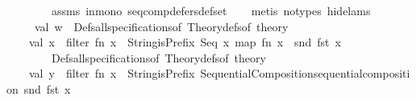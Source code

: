 \begin{isabellebody}
\ \ \ \ \ \ \ \ assms{\isacharparenleft}{\kern0pt}{}{\isacharparenright}{\kern0pt}\ in{\isacharunderscore}{\kern0pt}mono\ seq{\isacharunderscore}{\kern0pt}comp{\isacharunderscore}{\kern0pt}defers{\isacharunderscore}{\kern0pt}def{\isacharunderscore}{\kern0pt}set\isanewline
\ \ \isamarkupfalse%
\ {\isacharparenleft}{\kern0pt}metis\ {\isacharparenleft}{\kern0pt}no{\isacharunderscore}{\kern0pt}types{\isacharcomma}{\kern0pt}\ hide{\isacharunderscore}{\kern0pt}lams{\isacharparenright}{\kern0pt}{\isacharparenright}{\kern0pt}%
\endisatagproof
{\isafoldproof}%
%
\isadelimproof
\isanewline
%
\endisadelimproof
%
\isadelimML
\isanewline
%
\endisadelimML
%
\isatagML
{}\isamarkupfalse%
\ {\isacartoucheopen}\isanewline
\ \ \ \ {\isacharparenleft}{\kern0pt}{\isacharasterisk}{\kern0pt}\ val\ w\ {\isacharequal}{\kern0pt}\ {\isacharparenleft}{\kern0pt}Defs{\isachardot}{\kern0pt}all{\isacharunderscore}{\kern0pt}specifications{\isacharunderscore}{\kern0pt}of\ {\isacharparenleft}{\kern0pt}Theory{\isachardot}{\kern0pt}defs{\isacharunderscore}{\kern0pt}of\ {\isacharat}{\kern0pt}{\isacharbraceleft}{\kern0pt}theory{\isacharbraceright}{\kern0pt}{\isacharparenright}{\kern0pt}{\isacharparenright}{\kern0pt}\isanewline
\ \ \ \ val\ x\ {\isacharequal}{\kern0pt}\ filter\ {\isacharparenleft}{\kern0pt}fn\ x\ {\isacharequal}{\kern0pt}{\isachargreater}{\kern0pt}\ String{\isachardot}{\kern0pt}isPrefix\ {\isachardoublequote}{\kern0pt}Seq{\isachardoublequote}{\kern0pt}\ x{\isacharparenright}{\kern0pt}\ {\isacharparenleft}{\kern0pt}map\ {\isacharparenleft}{\kern0pt}fn\ x\ {\isacharequal}{\kern0pt}{\isachargreater}{\kern0pt}\ snd\ {\isacharparenleft}{\kern0pt}fst\ x{\isacharparenright}{\kern0pt}{\isacharparenright}{\kern0pt}\isanewline
\ \ \ \ \ \ \ \ {\isacharparenleft}{\kern0pt}Defs{\isachardot}{\kern0pt}all{\isacharunderscore}{\kern0pt}specifications{\isacharunderscore}{\kern0pt}of\ {\isacharparenleft}{\kern0pt}Theory{\isachardot}{\kern0pt}defs{\isacharunderscore}{\kern0pt}of\ {\isacharat}{\kern0pt}{\isacharbraceleft}{\kern0pt}theory{\isacharbraceright}{\kern0pt}{\isacharparenright}{\kern0pt}{\isacharparenright}{\kern0pt}{\isacharparenright}{\kern0pt}\ {\isacharasterisk}{\kern0pt}{\isacharparenright}{\kern0pt}\isanewline
\ \ \ \ val\ y\ {\isacharequal}{\kern0pt}\ filter\ {\isacharparenleft}{\kern0pt}fn\ x\ {\isacharequal}{\kern0pt}{\isachargreater}{\kern0pt}\ {\isacharparenleft}{\kern0pt}String{\isachardot}{\kern0pt}isPrefix\ {\isacharparenleft}{\kern0pt}{\isachardoublequote}{\kern0pt}Sequential{\isacharunderscore}{\kern0pt}Composition{\isachardot}{\kern0pt}sequential{\isacharunderscore}{\kern0pt}composition{\isachardoublequote}{\kern0pt}{\isacharparenright}{\kern0pt}\ {\isacharparenleft}{\kern0pt}snd\ {\isacharparenleft}{\kern0pt}fst\ {\isacharparenleft}{\kern0pt}x{\isacharparenright}{\kern0pt}{\isacharparenright}{\kern0pt}{\isacharparenright}{\kern0pt}{\isacharparenright}{\kern0pt}{\isacharparenright}{\kern0pt}\ \isanewline

\end{isabellebody}
